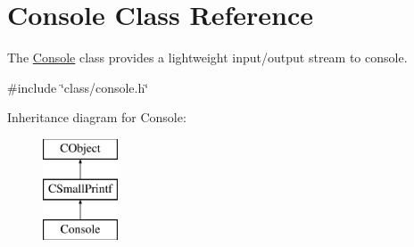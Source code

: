 \hypertarget{class_console}{\section{Console Class Reference}
\label{class_console}
}


The \hyperlink{class_console}{Console} class provides a lightweight input/output stream to console.  




{\ttfamily \#include \char`\"{}class/console.\-h\char`\"{}}

Inheritance diagram for Console\-:\begin{figure}[H]
\begin{center}
\leavevmode
\includegraphics[height=3.000000cm]{class_console}
\end{center}
\end{figure}
